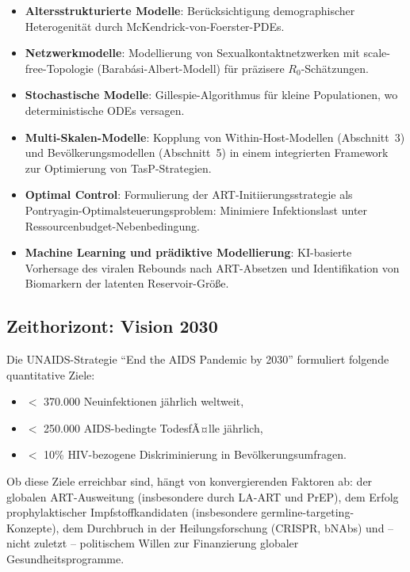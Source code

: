 ﻿\documentclass[a4paper,12pt]{article}
\theoremstyle{definition}
\begin{document}
\begin{itemize}
\item \textbf{Altersstrukturierte Modelle}: Ber\"ucksichtigung demographischer
      Heterogenit\"at durch McKendrick-von-Foerster-PDEs.
\item \textbf{Netzwerkmodelle}: Modellierung von Sexualkontaktnetzwerken mit
      scale-free-Topologie (Barab\'asi-Albert-Modell) f\"ur pr\"azisere
      $R_0$-Sch\"atzungen.
\item \textbf{Stochastische Modelle}: Gillespie-Algorithmus f\"ur kleine
      Populationen, wo deterministische ODEs versagen.
\item \textbf{Multi-Skalen-Modelle}: Kopplung von Within-Host-Modellen
      (Abschnitt~3) und Bev\"olkerungsmodellen (Abschnitt~5) in einem
      integrierten Framework zur Optimierung von TasP-Strategien.
\item \textbf{Optimal Control}: Formulierung der ART-Initiierungsstrategie
      als Pontryagin-Optimalsteuerungsproblem: Minimiere Infektionslast unter
      Ressourcenbudget-Nebenbedingung.
\item \textbf{Machine Learning und pr\"adiktive Modellierung}: KI-basierte
      Vorhersage des viralen Rebounds nach ART-Absetzen und Identifikation
      von Biomarkern der latenten Reservoir-Gr\"o\ss e.
\end{itemize}

\subsection{Zeithorizont: Vision 2030}

Die UNAIDS-Strategie ``End the AIDS Pandemic by 2030'' formuliert folgende
quantitative Ziele:
\begin{itemize}
\item $<$ 370.000 Neuinfektionen j\"ahrlich weltweit,
\item $<$ 250.000 AIDS-bedingte TodesfÃ¤lle j\"ahrlich,
\item $<$ 10\% HIV-bezogene Diskriminierung in Bev\"olkerungsumfragen.
\end{itemize}

Ob diese Ziele erreichbar sind, h\"angt von konvergierenden Faktoren ab:
der globalen ART-Ausweitung (insbesondere durch LA-ART und PrEP),
dem Erfolg prophylaktischer Impfstoffkandidaten (insbesondere germline-targeting-Konzepte),
dem Durchbruch in der Heilungsforschung (CRISPR, bNAbs) und -- nicht zuletzt --
politischem Willen zur Finanzierung globaler Gesundheitsprogramme.
\end{document}
